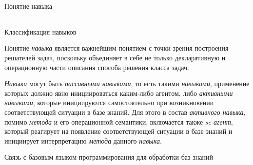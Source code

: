 \begin{frame}{\\Понятие навыка}
	\topline
	\justifying
        \begin{SCn}
        \end{SCn}
\end{frame}

\begin{frame}{\\Классификация навыков}
	\topline
	\justifying
    \vspace{10mm}
    
Понятие \textit{навыка} является важнейшим понятием с точки зрения построения решателей задач, поскольку объединяет в себе не только декларативную и операционную части описания способа решения класса задач.

\textit{Навыки} могут быть \textit{пассивными навыками}, то есть такими \textit{навыками}, применение которых должно явно инициироваться каким-либо агентом, либо \textit{активными навыками}, которые инициируются самостоятельно при возникновении соответствующей ситуации в базе знаний. Для этого в состав \textit{активного навыка}, помимо \textit{метода} и его операционной семантики, включается также \textit{sc-агент}, который реагирует на появление соответствующей ситуации в базе знаний и инициирует интерпретацию \textit{метода} данного \textit{навыка}.
\end{frame}

\begin{frame}{Связь с базовым языком программирования для обработки баз знаний}
 	\topline
 	\justifying

 \begin{SCn}
	
	
\end{SCn}
	
\end{frame}
